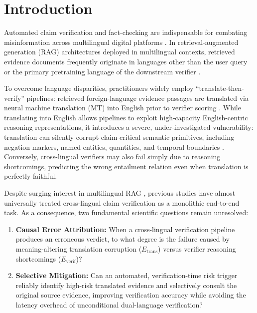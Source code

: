 \documentclass[11pt,a4paper]{article}
\begin{document}
\section{Introduction}
\label{sec:intro}

Automated claim verification and fact-checking are indispensable for combating misinformation across multilingual digital platforms \citep{thorne-etal-2018-fever,gupta-srikumar-2021-xfact}. In retrieval-augmented generation (RAG) architectures deployed in multilingual contexts, retrieved evidence documents frequently originate in languages other than the user query or the primary pretraining language of the downstream verifier \citep{lewis-etal-2020-rag,liu-etal-2025-xrag}.

To overcome language disparities, practitioners widely employ ``translate-then-verify'' pipelines: retrieved foreign-language evidence passages are translated via neural machine translation (MT) into English prior to verifier scoring \citep{ranaldi-etal-2026-multilingual,singhal-etal-2024-comparative}. While translating into English allows pipelines to exploit high-capacity English-centric reasoning representations, it introduces a severe, under-investigated vulnerability: translation can silently corrupt claim-critical semantic primitives, including negation markers, named entities, quantities, and temporal boundaries \citep{singhal-etal-2024-comparative}. Conversely, cross-lingual verifiers may also fail simply due to reasoning shortcomings, predicting the wrong entailment relation even when translation is perfectly faithful.

Despite surging interest in multilingual RAG \citep{ranaldi-etal-2026-multilingual,wang-etal-2026-languages}, previous studies have almost universally treated cross-lingual claim verification as a monolithic end-to-end task. As a consequence, two fundamental scientific questions remain unresolved:
\begin{enumerate}
    \item \textbf{Causal Error Attribution:} When a cross-lingual verification pipeline produces an erroneous verdict, to what degree is the failure caused by meaning-altering translation corruption ($E_{\text{trans}}$) versus verifier reasoning shortcomings ($E_{\text{verif}}$)?
    \item \textbf{Selective Mitigation:} Can an automated, verification-time risk trigger reliably identify high-risk translated evidence and selectively consult the original source evidence, improving verification accuracy while avoiding the latency overhead of unconditional dual-language verification?
\end{enumerate}
\end{document}
